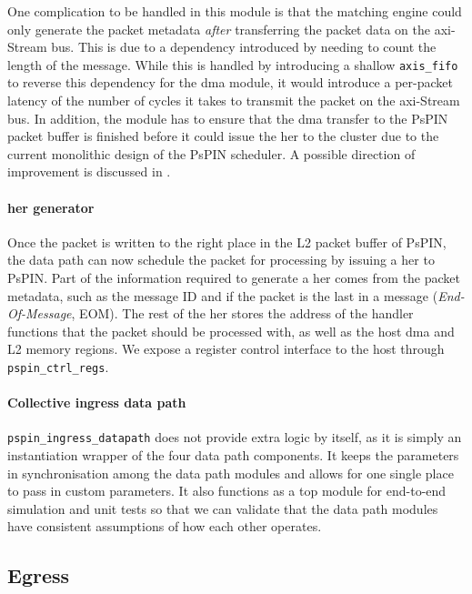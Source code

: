 One complication to be handled in this module is that the matching engine could only generate the packet metadata \emph{after} transferring the packet data on the \ac{axi}-Stream bus.  This is due to a dependency introduced by needing to count the length of the message.  While this is handled by introducing a shallow \texttt{axis\_\-fifo} to reverse this dependency for the \ac{dma} module, it would introduce a per-packet latency of the number of cycles it takes to transmit the packet on the \ac{axi}-Stream bus.  In addition, the module has to ensure that the \ac{dma} transfer to the PsPIN packet buffer is finished before it could issue the \ac{her} to the cluster due to the current monolithic design of the PsPIN scheduler.  A possible direction of improvement is discussed in .

\paragraph{\ac{her} generator} Once the packet is written to the right place in the L2 packet buffer of PsPIN, the data path can now schedule the packet for processing by issuing a \ac{her} to PsPIN.  Part of the information required to generate a \ac{her} comes from the packet metadata, such as the message ID and if the packet is the last in a message (\emph{End-Of-Message}, EOM).  The rest of the \ac{her} stores the address of the handler functions that the packet should be processed with, as well as the host \ac{dma} and L2 memory regions.  We expose a register control interface to the host through \texttt{pspin\_\-ctrl\_\-regs}.

\paragraph{Collective ingress data path} \texttt{pspin\_\-ingress\_\-datapath} does not provide extra logic by itself, as it is simply an instantiation wrapper of the four data path components.  It keeps the parameters in synchronisation among the data path modules and allows for one single place to pass in custom parameters.  It also functions as a top module for end-to-end simulation and unit tests so that we can validate that the data path modules have consistent assumptions of how each other operates.
 
\subsection{Egress}

